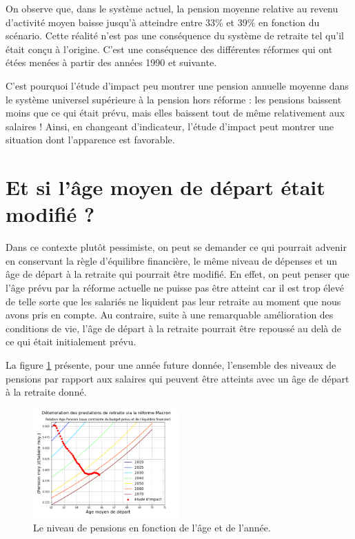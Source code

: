 \documentclass[10pt]{article}
\begin{document}
On observe que, dans le système actuel, la pension moyenne relative au revenu d'activité 
moyen baisse jusqu'à atteindre entre 33\% et 39\% en fonction du scénario. 
Cette réalité n'est pas une conséquence du système de retraite tel qu'il était conçu 
à l'origine. 
C'est une conséquence des différentes réformes qui ont étées menées 
à partir des années 1990 et suivante. 

C'est pourquoi l'étude d'impact peu montrer une pension annuelle moyenne 
dans le système universel supérieure à la pension hors réforme : 
les pensions baissent moins que ce qui était prévu, mais elles baissent 
tout de même relativement aux salaires ! 
Ainsi, en changeant d'indicateur, l'étude d'impact peut montrer une situation 
dont l'apparence est favorable. 


\section{Et si l'âge moyen de départ était modifié ?}

Dans ce contexte plutôt pessimiste, on peut se demander ce qui pourrait 
advenir en conservant la règle d'équilibre financière, le même niveau de dépenses 
et un âge de départ à la retraite qui pourrait être modifié. 
En effet, on peut penser que l'âge prévu par la réforme actuelle 
ne puisse pas être atteint car il est trop élevé de telle sorte que 
les salariés ne liquident pas leur retraite au moment que nous avons 
pris en compte. 
Au contraire, suite à une remarquable amélioration des conditions de vie, 
l'âge de départ à la retraite pourrait être repoussé au delà de ce qui 
était initialement prévu. 

La figure \ref{fig-simulation-age-vs-pensions} présente, pour une année future donnée, 
l'ensemble des niveaux de pensions par rapport aux salaires qui peuvent être atteints avec 
un âge de départ à la retraite donné. 

\begin{figure}
\begin{center}
\includegraphics[width=0.5\textwidth]{Simulation-Age-vs-pensions-vs-date.png}
\end{center}

\caption{Le niveau de pensions en fonction de l'âge et de l'année.}
\label{fig-simulation-age-vs-pensions}
\end{figure}
\end{document}
